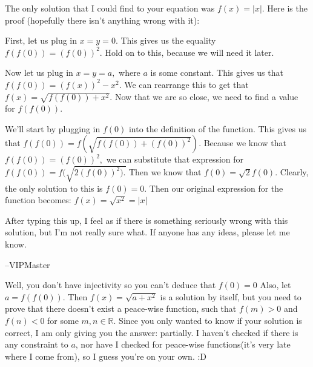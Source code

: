 \begin{solution}
	The only solution that I could find to your equation was $f(x) = |x|$. Here is the proof (hopefully there isn't anything wrong with it):

First, let us plug in $x = y = 0.$ This gives us the equality $f(f(0)) = (f(0))^2.$ Hold on to this, because we will need it later.

Now let us plug in $x = y = a,$ where $a$ is some constant. This gives us that $f(f(0)) = (f(x))^2 - x^2.$ We can rearrange this to get that $f(x) = \sqrt{f(f(0)) + x^2}.$ Now that we are so close, we need to find a value for $f(f(0)).$

We'll start by plugging in $f(0)$ into the definition of the function. This gives us that $f(f(0)) = f(\sqrt{f(f(0)) + (f(0))^2}).$ Because we know that $f(f(0)) = (f(0))^2,$ we can substitute that expression for $f(f(0)) = f(\sqrt{2(f(0))^2).}$ Then we know that $f(0) = \sqrt{2}f(0).$ Clearly, the only solution to this is $f(0) = 0.$ Then our original expression for the function becomes:
$\boxed{f(x) = \sqrt{x^2} = |x|}$

After typing this up, I feel as if there is something seriously wrong with this solution, but I'm not really sure what. If anyone has any ideas, please let me know.

--VIPMaster
\end{solution}



\begin{solution}
	Well, you don't have injectivity so you can't deduce that $f(0)=0$
Also, let $a=f(f(0))$. Then $f(x)=\sqrt{a+x^{2}}$ is a solution by itself, but you need to prove that there doesn't exist a peace-wise function, such that $f(m)>0$ and $f(n)<0$ for some $m,n\in\mathbb{R}$.
Since you only wanted to know if your solution is correct, I am only giving you the answer: partially.
I haven't checked if there is any constraint to $a$, nor have I checked for peace-wise functions(it's very late where I come from), so I guess you're on your own. :D
\end{solution}



